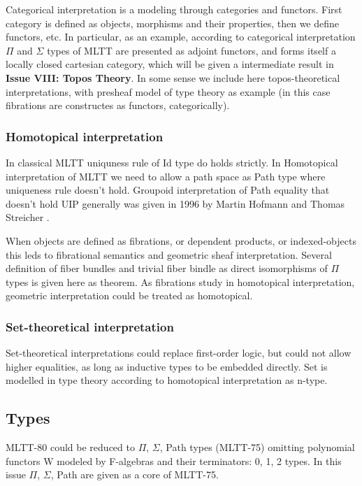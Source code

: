 \documentclass{article}
\theoremstyle{definition}
\begin{document}
Categorical interpretation \cite{Curien14} is a modeling through categories and functors.
First category is defined as objects, morphisms and their properties, then
we define functors, etc. In particular, as an example, according to categorical
interpretation $\Pi$ and $\Sigma$ types of MLTT are presented as adjoint
functors, and forms itself a locally closed cartesian category, which will be given a
intermediate result in {\bf Issue VIII: Topos Theory}. In some sense we include here
topos-theoretical interpretations, with presheaf model of type theory as
example (in this case fibrations are constructes as functors, categorically).

\subsubsection{Homotopical interpretation}

In classical MLTT uniquness rule of Id type do holds strictly. In Homotopical
interpretation of MLTT we need to allow a path space as Path type where uniqueness
rule doesn't hold. Groupoid interpretation of Path equality that doesn't hold UIP generally
was given in 1996 by Martin Hofmann and Thomas Streicher \cite{Hofmann96}.

When objects are defined as fibrations, or dependent products, or indexed-objects
this leds to fibrational semantics and geometric sheaf interpretation. Several definition
of fiber bundles and trivial fiber bindle as direct isomorphisms of $\Pi$ types is
given here as theorem. As fibrations study in homotopical interpretation, geometric
interpretation could be treated as homotopical.

\subsubsection{Set-theoretical interpretation}

Set-theoretical interpretations could replace first-order logic, but could not allow
higher equalities, as long as inductive types to be embedded directly. Set is modelled
in type theory according to homotopical interpretation as n-type.

\subsection{Types}

MLTT-80 could be reduced to $\Pi$, $\Sigma$, Path types (MLTT-75) omitting polynomial
functors W modeled by F-algebras and their terminators: 0, 1, 2 types.
In this issue $\Pi$, $\Sigma$, Path are given as a core of MLTT-75.
\end{document}

